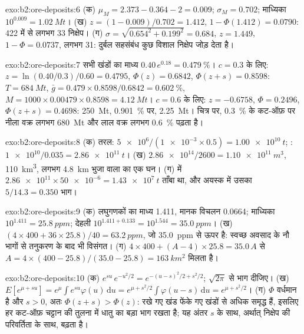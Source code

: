 \begin{solution}{exo:b2:ore-deposits:6}
(क) $\mu_M = 2.373 - 0.364 - 2 = 0.009$; $\sigma_M = 0.702$; माध्यिका $10^{0.009} = \qty{1.02}{Mt}$।
(ख) $z = (1 - 0.009)/0.702 = 1.412$, $1 - \Phi(1.412) = 0.0790$: 422 में से लगभग 33 निक्षेप।
(ग) $\sigma = \sqrt{0.654^2 + 0.199^2} = 0.684$, $z = 1.449$, $1 - \Phi = 0.0737$, लगभग 31: दुर्बल
सहसंबंध कुछ विशाल निक्षेप जोड़ देता है।
\end{solution}

\begin{solution}{exo:b2:ore-deposits:7}
सभी खंडों का माध्य $0.40\,e^{0.18} = \qty{0.479}{\percent}$। $c = 0.3$ के लिए: $z = \ln(0.40/0.3)/0.60 =
0.4795$, $\Phi(z) = 0.6842$, $\Phi(z + s) = 0.8598$: $T = \qty{684}{Mt}$, $\bar g = 0.479 \times
0.8598/0.6842 = \qty{0.602}{\percent}$, $M = 1000 \times 0.00479 \times 0.8598 = \qty{4.12}{Mt}$।
$c = 0.6$ के लिए: $z = -0.6758$, $\Phi = 0.2496$, $\Phi(z + s) = 0.4698$: \qty{250}{Mt},
\qty{0.901}{\percent} पर, \qty{2.25}{Mt}। चित्र पर, \qty{0.3}{\percent} के कट-ऑफ़ पर नीला वक्र लगभग
\qty{680}{Mt} और लाल वक्र लगभग \qty{0.6}{\percent} पढ़ता है।
\end{solution}

\begin{solution}{exo:b2:ore-deposits:8}
(क) तरल: $\num{5e6}/(\num{1e-3} \times 0.5) = \qty{1.00e10}{t}$; : $\num{1e10}/0.035 =
\qty{2.86e11}{t}$। (ख) $\num{2.86e14}/2600 = \qty{1.10e11}{m^3}$, \qty{110}{km^3}, लगभग
\qty{4.8}{km} भुजा वाला  का एक घन। (ग)  में $\num{2.86e11}
\times \num{50e-6} = \qty{1.43e7}{t}$ ताँबा था, और अयस्क में उसका $5/14.3 = 0.350$ भाग।
\end{solution}

\begin{solution}{exo:b2:ore-deposits:9}
(क) लघुगणकों का माध्य 1.411, मानक विचलन 0.0664; माध्यिका $10^{1.411} = \qty{25.8}{ppm}$;
देहली $10^{1.411 + 0.133} = 10^{1.544} = \qty{35.0}{ppm}$। (ख) $(4 \times 400 + 36 \times 25.8)/40 =
\qty{63.2}{ppm}$, जो \qty{35.0}{ppm} से ऊपर है: स्वच्छ अवसाद के नौ भागों से तनुकरण के बाद भी
विसंगत। (ग) $4 \times 400 + (A - 4) \times 25.8 = 35.0\,A$ से $A = 4 \times (400 -
25.8)/(35.0 - 25.8) = \qty{163}{km^2}$ मिलता है।
\end{solution}

\begin{solution}{exo:b2:ore-deposits:10}
(क) $e^{su}\,e^{-u^2/2} = e^{-(u - s)^2/2 + s^2/2}$; $\sqrt{2\pi}$ से भाग दीजिए। (ख) $E[e^{\mu + su}] =
e^{\mu}\int e^{su}\varphi(u)\,\mathrm{d}u = e^{\mu + s^2/2}\int\varphi(u - s)\,\mathrm{d}u = e^{\mu +
s^2/2}$। (ग) $\Phi$ वर्धमान है और $s > 0$, अतः $\Phi(z + s) > \Phi(z)$: रखे गए खंड फेंके गए खंडों से
अधिक समृद्ध हैं, इसलिए हर कट-ऑफ़ चट्टान की तुलना में धातु का बड़ा भाग रखता है; यह अंतर
$s$ के साथ, अर्थात् निक्षेप की परिवर्तिता के साथ, बढ़ता है।
\end{solution}

